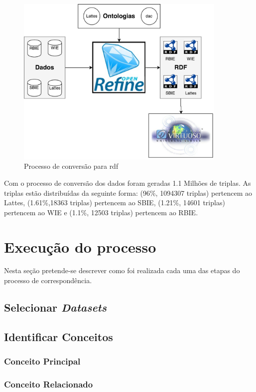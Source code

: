 \begin{figure}[!ht]
	\centering
	\includegraphics[width=0.9\textwidth]{./imagens/conversao.pdf}
	\caption{Processo de conversão para rdf}
	\label{fig:conversao}
\end{figure}

Com o processo de conversão dos dados foram geradas 1.1 Milhões de triplas. As triplas estão distribuídas da seguinte forma: (96\%, 1094307 triplas) pertencem ao Lattes, (1.61\%,18363 triplas) pertencem ao SBIE, (1.21\%, 14601 triplas) pertencem ao WIE e (1.1\%, 12503 triplas) pertencem ao RBIE.

\newpage
\section{Execução do processo}
Nesta seção pretende-se descrever como foi realizada cada uma das etapas do processo de correspondência. 

\subsection{Selecionar \textit{Datasets}}
\label{sub:selecionar_datasets}
\subsection{Identificar Conceitos}
\subsubsection{Conceito Principal}
\subsubsection{Conceito Relacionado}
